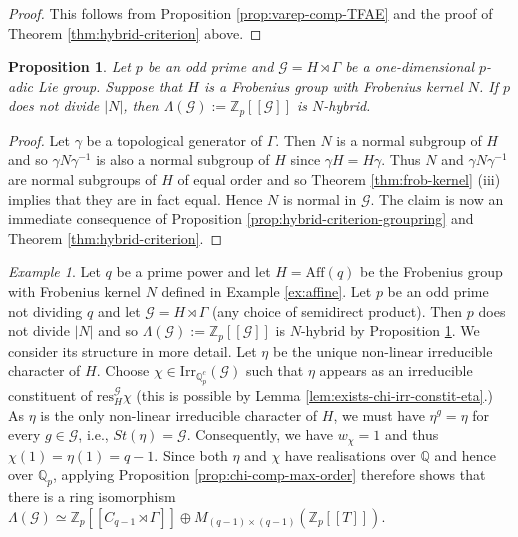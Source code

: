 \documentclass[12pt]{amsart}
\theoremstyle{plain}
\newtheorem{prop}[theorem]{Proposition}
\theoremstyle{remark}
\newtheorem{example}[theorem]{Example}
\theoremstyle{definition}
\numberwithin{equation}{section}
\begin{document}
\begin{proof}
This follows from Proposition \ref{prop:varep-comp-TFAE} and the proof of Theorem \ref{thm:hybrid-criterion} above.
\end{proof}

\begin{prop}\label{prop:frob-N-iwasawa-hybrid}
Let $p$ be an odd prime and $\mathcal{G} = H \rtimes \Gamma$ be a one-dimensional $p$-adic Lie group.
Suppose that $H$ is a Frobenius group with Frobenius kernel $N$.
If $p$ does not divide $|N|$, then $\Lambda(\mathcal{G}):={\mathbb{Z}}_{p}[[\mathcal{G}]]$ is $N$-hybrid.
\end{prop}

\begin{proof}
Let $\gamma$ be a topological generator of $\Gamma$.
Then $N$ is a normal subgroup of $H$ and so $\gamma N \gamma^{-1}$ is also a normal subgroup of $H$
since $\gamma H = H \gamma$. Thus $N$ and $\gamma N \gamma^{-1}$ are normal subgroups of $H$ of equal order and so
Theorem \ref{thm:frob-kernel} (iii) implies that they are in fact equal. Hence $N$ is normal in $\mathcal{G}$.
The claim is now an immediate consequence of Proposition \ref{prop:hybrid-criterion-groupring}
and Theorem \ref{thm:hybrid-criterion}.
\end{proof}

\begin{example}
Let $q$ be a prime power and let $H={\mathrm{Aff}}(q)$ be the Frobenius group with Frobenius kernel $N$ defined in Example \ref{ex:affine}.
Let $p$ be an odd prime not dividing $q$ and let $\mathcal{G} = H \rtimes \Gamma$ (any choice of semidirect product).
Then $p$ does not divide $|N|$ and so
$\Lambda(\mathcal{G}) := {\mathbb{Z}}_{p}[[\mathcal{G}]]$ is $N$-hybrid  by Proposition \ref{prop:frob-N-iwasawa-hybrid}.
We consider its structure in more detail.
Let $\eta$ be the unique non-linear irreducible character of $H$.
Choose $\chi \in {\mathrm{Irr}}_{{\mathbb{Q}}_{p}^{c}}(\mathcal{G})$
such that $\eta$ appears as an irreducible constituent of ${\mathrm{res}}^{\mathcal{G}}_{H} \chi$ (this is possible by Lemma \ref{lem:exists-chi-irr-constit-eta}.)
As $\eta$ is the only non-linear irreducible character of $H$, we must have $\eta^{g} = \eta$ for every $g \in \mathcal{G}$,
i.e., $St(\eta) = \mathcal{G}$. Consequently, we have $w_{\chi} = 1$ and thus $\chi(1) = \eta(1) = q-1$.
Since both $\eta$ and $\chi$ have realisations over ${\mathbb{Q}}$ and hence over ${\mathbb{Q}}_{p}$,
applying Proposition \ref{prop:chi-comp-max-order} therefore shows that there is a ring isomorphism
$\Lambda(\mathcal{G}) \simeq {\mathbb{Z}}_{p}[[C_{q-1} \rtimes \Gamma]] \oplus M_{(q-1) \times (q-1)}({\mathbb{Z}}_{p}[[T]])$.
\end{example}
\end{document}
